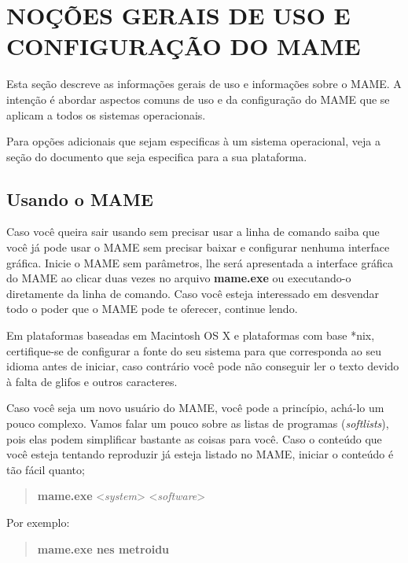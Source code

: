 \documentclass[letterpaper,10pt,brazil]{sphinxmanual}
\begin{document}
\chapter{NOÇÕES GERAIS DE USO E CONFIGURAÇÃO DO MAME}
\label{usingmame/index:nocoes-gerais-de-uso-e-configuracao-do-mame}\label{usingmame/index::doc}
Esta seção descreve as informações gerais de uso e informações sobre
o MAME. A intenção é abordar aspectos comuns de uso e da configuração do
MAME que se aplicam a todos os sistemas operacionais.

Para opções adicionais que sejam especificas à um sistema operacional,
veja a seção do documento que seja especifica para a sua plataforma.


\section{Usando o MAME}
\label{usingmame/usingmame:usando-o-mame}\label{usingmame/usingmame::doc}
Caso você queira sair usando sem precisar usar a linha de comando
saiba que você já pode usar o MAME sem precisar baixar e configurar
nenhuma interface gráfica. Inicie o MAME sem parâmetros, lhe será
apresentada a interface gráfica do MAME ao clicar duas vezes no arquivo
\textbf{mame.exe} ou executando-o diretamente da linha de comando.
Caso você esteja interessado em desvendar todo o poder que o MAME pode
te oferecer, continue lendo.

Em plataformas baseadas em Macintosh OS X e plataformas com base *nix,
certifique-se de configurar a fonte do seu sistema para que corresponda
ao seu idioma antes de iniciar, caso contrário você pode não conseguir
ler o texto devido à falta de glifos e outros caracteres.

Caso você seja um novo usuário do MAME, você pode a princípio, achá-lo
um pouco complexo. Vamos falar um pouco sobre as listas de programas
(\emph{softlists}), pois elas podem simplificar bastante as coisas para você.
Caso o conteúdo que você esteja tentando reproduzir já esteja listado no
MAME, iniciar o conteúdo é tão fácil quanto;
\begin{quote}

\textbf{mame.exe} \textless{}\emph{system}\textgreater{} \textless{}\emph{software}\textgreater{}
\end{quote}

Por exemplo:
\begin{quote}

\textbf{mame.exe nes metroidu}
\end{quote}
\end{document}
